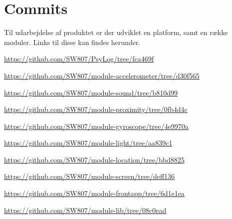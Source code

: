 \chapter{Commits}
Til udarbejdelse af produktet er der udviklet en platform, samt en række moduler.
Links til disse kan findes herunder.

\begin{description}[style=nextline]
	\item[PsyLog] \url{https://github.com/SW807/PsyLog/tree/fca469f}
	\item[module-accelerometer] \url{https://github.com/SW807/module-accelerometer/tree/d30f565}
	\item[module-sound] \url{https://github.com/SW807/module-sound/tree/b810d99}
	\item[module-proximity] \url{https://github.com/SW807/module-proximity/tree/0fb4d4c}
	\item[module-gyroscope] \url{https://github.com/SW807/module-gyroscope/tree/4e9970a}
	\item[module-light] \url{https://github.com/SW807/module-light/tree/aa839c1}
	\item[module-location] \url{https://github.com/SW807/module-location/tree/bbd8825}
	\item[module-screen] \url{https://github.com/SW807/module-screen/tree/deff136}
	\item[module-frontapp] \url{https://github.com/SW807/module-frontapp/tree/6d1e1ea}
	\item[module-lib] \url{https://github.com/SW807/module-lib/tree/08c0ead}
\end{description}